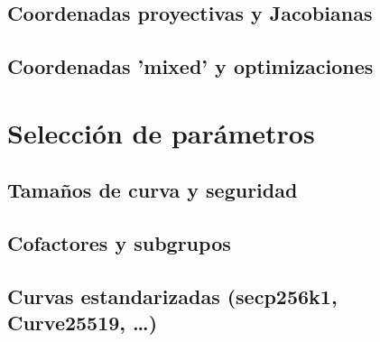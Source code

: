 \subsection{Coordenadas proyectivas y Jacobianas}
\subsection{Coordenadas 'mixed' y optimizaciones}

\section{Selección de parámetros}
\subsection{Tamaños de curva y seguridad}
\subsection{Cofactores y subgrupos}
\subsection{Curvas estandarizadas (secp256k1, Curve25519, …)}
